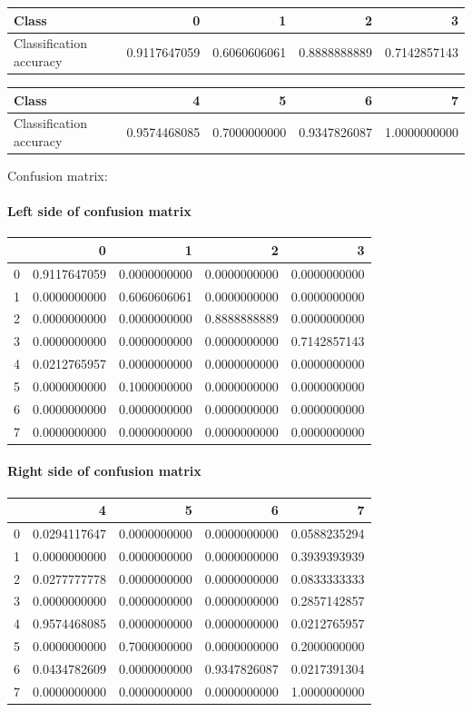 \begin{tabular}{l|r|r|r|r}
Class & 0 & 1 & 2 & 3 \\
\hline
Classification accuracy & 0.9117647059 & 0.6060606061 & 0.8888888889 & 0.7142857143 \\
\end{tabular}

\begin{tabular}{l|r|r|r|r}
Class & 4 & 5 & 6 & 7 \\
\hline
Classification accuracy & 0.9574468085 & 0.7000000000 & 0.9347826087 & 1.0000000000 \\
\end{tabular}

Confusion matrix:

\paragraph{Left side of confusion matrix}
\begin{tabular}{l|r|r|r|r}
 & 0 & 1 & 2 & 3 \\
\hline
0 & 0.9117647059 & 0.0000000000 & 0.0000000000 & 0.0000000000 \\
1 & 0.0000000000 & 0.6060606061 & 0.0000000000 & 0.0000000000 \\
2 & 0.0000000000 & 0.0000000000 & 0.8888888889 & 0.0000000000 \\
3 & 0.0000000000 & 0.0000000000 & 0.0000000000 & 0.7142857143 \\
4 & 0.0212765957 & 0.0000000000 & 0.0000000000 & 0.0000000000 \\
5 & 0.0000000000 & 0.1000000000 & 0.0000000000 & 0.0000000000 \\
6 & 0.0000000000 & 0.0000000000 & 0.0000000000 & 0.0000000000 \\
7 & 0.0000000000 & 0.0000000000 & 0.0000000000 & 0.0000000000 \\
\end{tabular}

\paragraph{Right side of confusion matrix}
\begin{tabular}{l|r|r|r|r}
 & 4 & 5 & 6 & 7\\
\hline
0 & 0.0294117647 & 0.0000000000 & 0.0000000000 & 0.0588235294 \\
1 & 0.0000000000 & 0.0000000000 & 0.0000000000 & 0.3939393939 \\
2 & 0.0277777778 & 0.0000000000 & 0.0000000000 & 0.0833333333 \\
3 & 0.0000000000 & 0.0000000000 & 0.0000000000 & 0.2857142857 \\
4 & 0.9574468085 & 0.0000000000 & 0.0000000000 & 0.0212765957 \\
5 & 0.0000000000 & 0.7000000000 & 0.0000000000 & 0.2000000000 \\
6 & 0.0434782609 & 0.0000000000 & 0.9347826087 & 0.0217391304 \\
7 & 0.0000000000 & 0.0000000000 & 0.0000000000 & 1.0000000000 \\
\end{tabular}

